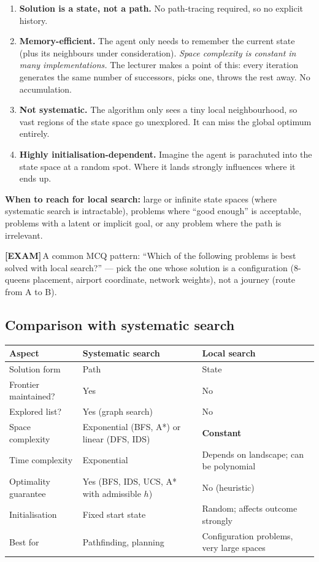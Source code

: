 \documentclass[11pt, a4paper]{article}
\newcommand{\thead}[1]{\textbf{#1}}
\newcommand{\examflag}{\textcolor{tipBd}{\textbf{[EXAM]}}\,}
\begin{document}
\begin{enumerate}
  \item \textbf{Solution is a state, not a path.} No path-tracing required, so no explicit history.
  \item \textbf{Memory-efficient.} The agent only needs to remember the current state (plus its neighbours under consideration). \emph{Space complexity is constant in many implementations.} The lecturer makes a point of this: every iteration generates the same number of successors, picks one, throws the rest away. No accumulation.
  \item \textbf{Not systematic.} The algorithm only sees a tiny local neighbourhood, so vast regions of the state space go unexplored. It can miss the global optimum entirely.
  \item \textbf{Highly initialisation-dependent.} Imagine the agent is parachuted into the state space at a random spot. Where it lands strongly influences where it ends up.
\end{enumerate}

\textbf{When to reach for local search:} large or infinite state spaces (where systematic search is intractable), problems where ``good enough'' is acceptable, problems with a latent or implicit goal, or any problem where the path is irrelevant.

\examflag{}A common MCQ pattern: ``Which of the following problems is best solved with local search?'' — pick the one whose solution is a configuration (8-queens placement, airport coordinate, network weights), not a journey (route from A to B).

\subsection{Comparison with systematic search}

\begin{center}
\renewcommand{\arraystretch}{1.2}
\begin{tabular}{@{}p{4cm}p{5cm}p{5.5cm}@{}}
\toprule
\thead{Aspect} & \thead{Systematic search} & \thead{Local search} \\
\midrule
Solution form        & Path                          & State \\
Frontier maintained? & Yes                           & No \\
Explored list?       & Yes (graph search)            & No \\
Space complexity     & Exponential (BFS, A*) or linear (DFS, IDS) & \textbf{Constant} \\
Time complexity      & Exponential                   & Depends on landscape; can be polynomial \\
Optimality guarantee & Yes (BFS, IDS, UCS, A* with admissible $h$) & No (heuristic) \\
Initialisation       & Fixed start state             & Random; affects outcome strongly \\
Best for             & Pathfinding, planning         & Configuration problems, very large spaces \\
\bottomrule
\end{tabular}
\end{center}
\end{document}
